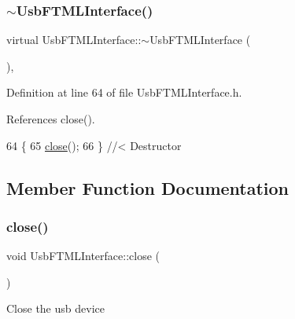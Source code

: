 \mbox{\label{classUsbFTMLInterface_a0bf44726e717235861347e61ac76a799}} 
\subsubsection{\texorpdfstring{$\sim$\+Usb\+F\+T\+M\+L\+Interface()}{~UsbFTMLInterface()}}
{\footnotesize\ttfamily virtual Usb\+F\+T\+M\+L\+Interface\+::$\sim$\+Usb\+F\+T\+M\+L\+Interface (\begin{DoxyParamCaption}{ }\end{DoxyParamCaption})\hspace{0.3cm}{\ttfamily [inline]}, {\ttfamily [virtual]}}



Definition at line 64 of file Usb\+F\+T\+M\+L\+Interface.\+h.



References close().


\begin{DoxyCode}
64                               \{
65     \hyperlink{classUsbFTMLInterface_a1eaa27bd62bc381f60aa837f70a70117}{close}();
66   \} \textcolor{comment}{//< Destructor}
\end{DoxyCode}


\subsection{Member Function Documentation}
\mbox{\label{classUsbFTMLInterface_a1eaa27bd62bc381f60aa837f70a70117}} 
\subsubsection{\texorpdfstring{close()}{close()}}
{\footnotesize\ttfamily void Usb\+F\+T\+M\+L\+Interface\+::close (\begin{DoxyParamCaption}{ }\end{DoxyParamCaption})}

Close the usb device 

